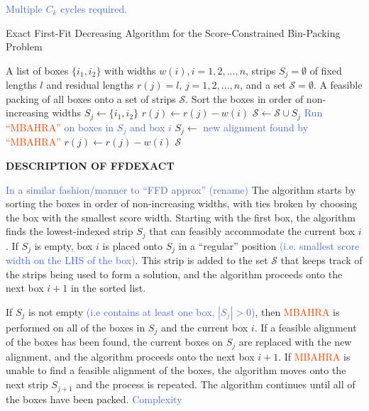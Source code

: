 \documentclass[oribibl]{llncs}
\begin{document}
\textcolor{RoyalBlue}{Multiple $C_k$ cycles required.}

\begin{algorithm}[H]
	\caption{\textcolor{OliveGreen}{Exact First-Fit Decreasing Algorithm for the Score-Constrained Bin-Packing Problem}}
	\label{alg:ffdexact}
	\begin{algorithmic}[1]
	\Require A list of boxes $\{i_1, i_2\}$ with widths $w(i), i = 1, 2, ..., n$, strips $S_j = \emptyset$ of fixed lengths $l$ and residual lengths $r(j) = l$, $j = 1, 2, ...,n$, and a set $\mathcal{S} = \emptyset$.
	\Ensure A feasible packing of all boxes onto a set of strips $\mathcal{S}$.
	\State Sort the boxes in order of non-increasing widths
				\State $S_j \gets \{i_1, i_2\}$
				\State $r(j) \gets r(j) - w(i)$
				\State $\mathcal{S} \gets \mathcal{S} \cup S_j$
				\Break
				\State \textcolor{RoyalBlue}{Run} \textcolor{OrangeRed}{``MBAHRA''} \textcolor{RoyalBlue}{on boxes in $S_j$ and box $i$}
					\State $S_j \gets$ \textcolor{RoyalBlue}{new alignment found by} \textcolor{OrangeRed}{``MBAHRA''}
					\State $r(j) \gets r(j) - w(i)$
					\Break
				\EndIf
			\EndIf
		\EndFor
	\EndFor
	\Return $\mathcal{S}$
	\end{algorithmic}	
\end{algorithm}

\textbf{\textcolor{ProcessBlue}{DESCRIPTION OF FFDEXACT}}

\textcolor{RoyalBlue}{In a similar fashion/manner to ``FFD approx'' (rename)} The algorithm starts by sorting the boxes in order of non-increasing widths, with ties broken by choosing the box with the smallest score width. Starting with the first box, the algorithm finds the lowest-indexed strip $S_j$ that can feasibly accommodate the current box $i$. If $S_j$ is empty, box $i$ is placed onto $S_j$ in a ``regular'' position \textcolor{RoyalBlue}{(i.e. smallest score width on the LHS of the box)}. This strip is added to the set $\mathcal{S}$ that keeps track of the strips being used to form a solution, and the algorithm proceeds onto the next box $i+1$ in the sorted list.

If $S_j$ is not empty \textcolor{RoyalBlue}{(i.e contains at least one box, $|S_j| > 0$)}, then \textcolor{OrangeRed}{MBAHRA} is performed on all of the boxes in $S_j$ and the current box $i$. If a feasible alignment of the boxes has been found, the current boxes on $S_j$ are replaced with the new alignment, and the algorithm proceeds onto the next box $i+1$. If \textcolor{OrangeRed}{MBAHRA} is unable to find a feasible alignment of the boxes, the algorithm moves onto the next strip $S_{j+1}$ and the process is repeated. The algorithm continues until all of the boxes have been packed. \textcolor{RoyalBlue}{Complexity}
\end{document}
